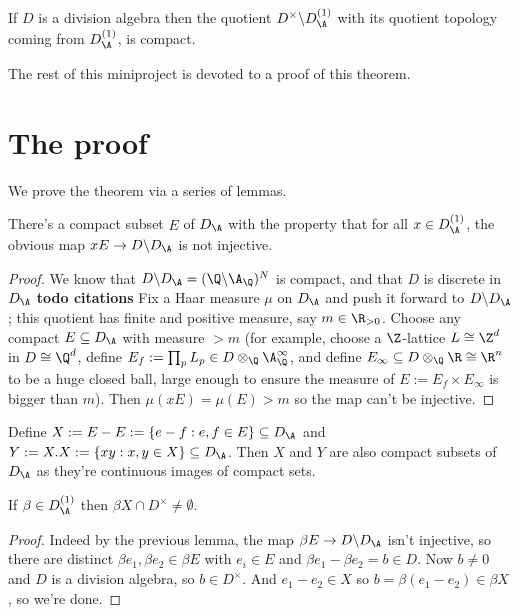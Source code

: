 \begin{theorem}
  \label{AdeleRing.DivisionAlgebra.compact_quotient} If $D$ is a division algebra then
  the quotient $D^\times\backslash D_{\A}^{(1)}$
  with its quotient topology coming from $D_{\A}^{(1)}$, is compact.
\end{theorem}

The rest of this miniproject is devoted to a proof of this theorem.

\section{The proof}

We prove the theorem via a series of lemmas.

\begin{lemma}
  \label{E}
  There's a compact subset $E$ of $D_{\A}$
  with the property that for all $x\in D_{\A}^{(1)}$,
  the obvious map $xE\to D\backslash D_{\A}$ is not injective.
\end{lemma}

\begin{proof} We know that $D\backslash D_{\A}=(\Q\backslash\A_{\Q})^N$
  is compact, and that $D$ is discrete in $D_{\A}$ {\bf todo citations}
    Fix a Haar measure $\mu$ on $D_{\A}$ and push it forward
    to $D\backslash D_{\A}$; this quotient has finite
    and positive measure, say $m\in\R_{>0}$.
    Choose any compact $E\subseteq D_{\A}$ with measure $> m$
    (for example, choose a $\Z$-lattice $L\cong\Z^d$ in $D\cong\Q^d$,
    define $E_f:=\prod_p L_p\in D\otimes_{\Q}\A_{\Q}^\infty$,
    and define $E_{\infty}\subseteq D\otimes_{\Q}\R\cong\R^n$ to be a huge closed
    ball, large enough to ensure the measure of $E:=E_f\times E_{\infty}$ is bigger than $m$).
    Then $\mu(xE)=\mu(E)>m$ so the map can't be injective.
\end{proof}

Define $X:=E-E:=\{e-f:e,f\in E\}\subseteq D_{\A}$ and $Y:=X.X:=\{xy:x,y\in X\}\subseteq D_{\A}$.
  Then $X$ and $Y$ are
  also compact subsets of $D_{\A}$ as they're continuous images
  of compact sets.

  \begin{lemma}
    \label{X_meets_kernel}
    If $\beta\in D_{\A}^{(1)}$ then
  $\beta X\cap D^\times\not=\emptyset$.
  \end{lemma}
  \begin{proof}
  Indeed by the previous lemma, the map $\beta E\to D\backslash D_{\A}$
  isn't injective, so there are distinct
  $\beta e_1,\beta e_2\in \beta E$ with $e_i\in E$ and
  $\beta e_1-\beta e_2=b\in D$.
  Now $b\not=0$ and $D$ is a division algebra, so $b\in D^\times$.
  And $e_1-e_2\in X$ so $b=\beta(e_1-e_2)\in \beta X$, so we're done.
\end{proof}

